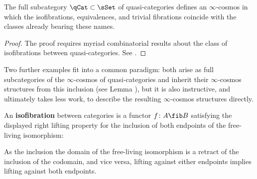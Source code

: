 \begin{proposition}\label{prop:qcat-cosmos}
  The full subcategory $\qCat\subset\sSet$ of quasi-categories defines an $\infty$-cosmos in which the isofibrations, equivalences, and trivial fibrations coincide with the classes  already bearing these names.
\end{proposition}
\begin{proof}
 The proof requires myriad combinatorial results about the class of isofibrations between quasi-categories. See \cite[\S D]{RiehlVerity:2022eo}.
\end{proof}


Two further examples fit into a common paradigm: both arise as full subcategories of the $\infty$-cosmos of quasi-categories and inherit their $\infty$-cosmos structures from this inclusion (see Lemma \cite[6.1.4]{RiehlVerity:2022eo}), but it is also instructive, and ultimately takes less work, to describe the resulting $\infty$-cosmos structures directly.

\begin{definition}\label{defn:cat-isofibration}
An \textbf{isofibration} between categories is a functor $f \colon A \fib B$ satisfying the displayed right lifting property for the inclusion of both endpoints of the free-living isomorphism:
\begin{center}
  \end{center}
\end{definition}

As the inclusion the domain of the free-living isomorphism is a retract of the inclusion of the codomain, and vice versa, lifting against either endpoints implies lifting against both endpoints.

